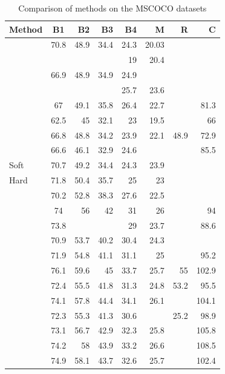 \begingroup
\renewcommand*{\arraystretch}{1}
\begin{longtable}[ht]{lcrrrrrr}
    \caption{Comparison of methods on the MSCOCO datasets}\\
    \toprule
    Method	&	B1	&	B2	&	B3	&	B4	&	M	&   R   &	C \\
    \midrule
    \citet{Kiros2014_LBL}	&	70.8	&	48.9	&	34.4	&	24.3	&	20.03	&		&		\\
    \citet{Chen2015}	&		&		&		&	19	&	20.4	&		&		\\
    \citet{Donahue2015}	&	66.9	&	48.9	&	34.9	&	24.9	&		&		&		\\
    \citet{Fang2015}	&		&		&		&	25.7	&	23.6	&		&		\\
    \citet{Jia2015}	&	67	&	49.1	&	35.8	&	26.4	&	22.7	&		&	81.3	\\
    \citet{Karpathy2015}	&	62.5	&	45	&	32.1	&	23	&	19.5	&		&	66	\\
    \citet{Mao2015_mRNN}	&	66.8	&	48.8	&	34.2	&	23.9	&	22.1	&	48.9	&	72.9	\\
    \citet{Vinyals2015}	&	66.6	&	46.1	&	32.9	&	24.6	&		&		&	85.5	\\
    \citet{Xu2015} Soft	&	70.7	&	49.2	&	34.4	&	24.3	&	23.9	&		&		\\
    \citet{Xu2015} Hard	&	71.8	&	50.4	&	35.7	&	25	&	23	&		&		\\
    \citet{Oruganti2016}	&	70.2	&	52.8	&	38.3	&	27.6	&	22.5	&		&		\\
    \citet{Wu2016}	&	74	&	56	&	42	&	31	&	26	&		&	94	\\
    \citet{Yang2016_RevNet}	&	73.8	&		&		&	29	&	23.7	&		&	88.6	\\
    \citet{You2016}	&	70.9	&	53.7	&	40.2	&	30.4	&	24.3	&		&		\\
    \citet{Chen2017_SCA}	&	71.9	&	54.8	&	41.1	&	31.1	&	25	&		&	95.2	\\
    \citet{Chen2017_RLSTM}	&	76.1	&	59.6	&	45	&	33.7	&	25.7	&	55	&	102.9	\\
    \citet{Fu2017}	&	72.4	&	55.5	&	41.8	&	31.3	&	24.8	&	53.2	&	95.5	\\
    \citet{Gan2017_SCN}	&	74.1	&	57.8	&	44.4	&	34.1	&	26.1	&		&	104.1	\\
    \citet{Gu2017}	&	72.3	&	55.3	&	41.3	&	30.6	&		&	25.2	&	98.9	\\
    \citet{Liu2017_MAT}	&	73.1	&	56.7	&	42.9	&	32.3	&	25.8	&		&	105.8	\\
    \citet{Lu2017}	&	74.2	&	58	&	43.9	&	33.2	&	26.6	&		&	108.5	\\
    \citet{Mun2017}	&	74.9	&	58.1	&	43.7	&	32.6	&	25.7	&		&	102.4	\\

\end{longtable}
